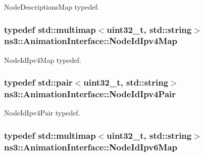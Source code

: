 Node\+Descriptions\+Map typedef. 

\subsubsection[{\texorpdfstring{Node\+Id\+Ipv4\+Map}{NodeIdIpv4Map}}]{\setlength{\rightskip}{0pt plus 5cm}typedef std\+::multimap$<$uint32\+\_\+t, std\+::string$>$ {\bf ns3\+::\+Animation\+Interface\+::\+Node\+Id\+Ipv4\+Map}\hspace{0.3cm}{\ttfamily [private]}}\hypertarget{classns3_1_1AnimationInterface_ae425e5a70267f86f9c979eda36573041}{}\label{classns3_1_1AnimationInterface_ae425e5a70267f86f9c979eda36573041}


Node\+Id\+Ipv4\+Map typedef. 

\subsubsection[{\texorpdfstring{Node\+Id\+Ipv4\+Pair}{NodeIdIpv4Pair}}]{\setlength{\rightskip}{0pt plus 5cm}typedef std\+::pair$<$uint32\+\_\+t, std\+::string$>$ {\bf ns3\+::\+Animation\+Interface\+::\+Node\+Id\+Ipv4\+Pair}\hspace{0.3cm}{\ttfamily [private]}}\hypertarget{classns3_1_1AnimationInterface_ab4227c3587cfdddd08d58c242a03c0bd}{}\label{classns3_1_1AnimationInterface_ab4227c3587cfdddd08d58c242a03c0bd}


Node\+Id\+Ipv4\+Pair typedef. 

\subsubsection[{\texorpdfstring{Node\+Id\+Ipv6\+Map}{NodeIdIpv6Map}}]{\setlength{\rightskip}{0pt plus 5cm}typedef std\+::multimap$<$uint32\+\_\+t, std\+::string$>$ {\bf ns3\+::\+Animation\+Interface\+::\+Node\+Id\+Ipv6\+Map}\hspace{0.3cm}{\ttfamily [private]}}\hypertarget{classns3_1_1AnimationInterface_a39ea5e1a91cfc2537825073a9bc8bd58}{}\label{classns3_1_1AnimationInterface_a39ea5e1a91cfc2537825073a9bc8bd58}


